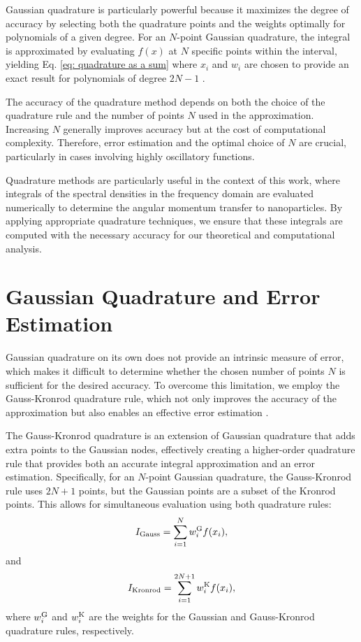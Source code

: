 Gaussian quadrature is particularly powerful because it maximizes the degree of accuracy by selecting both the quadrature points and the weights optimally for polynomials of a given degree. For an $N$-point Gaussian quadrature, the integral is approximated by evaluating $f(x)$ at $N$ specific points within the interval, yielding Eq. \eqref{eq: quadrature as a sum} where $x_i$ and $w_i$ are chosen to provide an exact result for polynomials of degree $2N-1$ \cite{kahaner1989numerical, hildebrand1987numeric, press2007numerical}.

The accuracy of the quadrature method depends on both the choice of the quadrature rule and the number of points $N$ used in the approximation. Increasing $N$ generally improves accuracy but at the cost of computational complexity. Therefore, error estimation and the optimal choice of $N$ are crucial, particularly in cases involving highly oscillatory functions.

Quadrature methods are particularly useful in the context of this work, where integrals of the spectral densities in the frequency domain are evaluated numerically to determine the angular momentum transfer to nanoparticles. By applying appropriate quadrature techniques, we ensure that these integrals are computed with the necessary accuracy for our theoretical and computational analysis.


\section{Gaussian Quadrature and Error Estimation}

Gaussian quadrature on its own does not provide an intrinsic measure of error, which makes it difficult to determine whether the chosen number of points $N$ is sufficient for the desired accuracy. To overcome this limitation, we employ the Gauss-Kronrod quadrature rule, which not only improves the accuracy of the approximation but also enables an effective error estimation \cite{kahaner1989numerical, hildebrand1987numeric, press2007numerical}.


The Gauss-Kronrod quadrature is an extension of Gaussian quadrature that adds extra points to the Gaussian nodes, effectively creating a higher-order quadrature rule that provides both an accurate integral approximation and an error estimation. Specifically, for an $N$-point Gaussian quadrature, the Gauss-Kronrod rule uses $2N+1$ points, but the Gaussian points are a subset of the Kronrod points. This allows for simultaneous evaluation using both quadrature rules:
\begin{equation}
    I_{\rm Gauss} = \sum_{i=1}^{N} w_i^{\rm G} f(x_i),
\end{equation}
and
\begin{equation}
    I_{\rm Kronrod} = \sum_{i=1}^{2N+1} w_i^{\rm K} f(x_i),
\end{equation}
where $w_i^{\rm G}$ and $w_i^{\rm K}$ are the weights for the Gaussian and Gauss-Kronrod quadrature rules, respectively.

